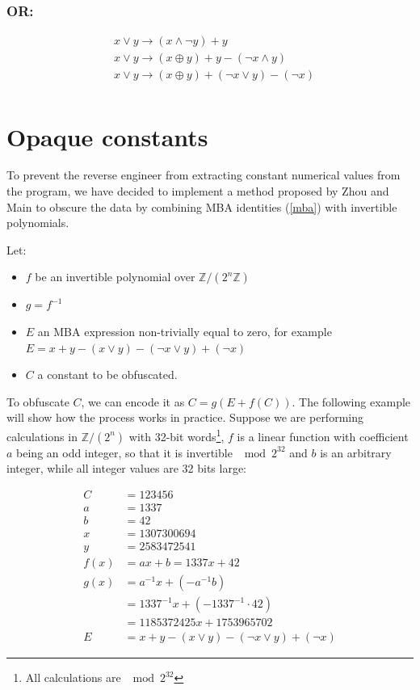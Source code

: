 \documentclass[
  digital, %
  notable,   %
  twoside, %
  nolof,     %
  nolot,     %
]{fithesis3}
\theoremstyle{definition}
\begin{document}
\subsubsection{OR:}
$$
\begin{aligned}
&x \vee y \rightarrow(x \wedge \neg y) + y\\
&x \vee y \rightarrow(x \oplus y)+y-(\neg x \wedge y) \\
&x \vee y \rightarrow(x \oplus y)+(\neg x \vee y)-(\neg x) \\
\end{aligned}
$$

\section{Opaque constants} \label{obf_const}

To prevent the reverse engineer from extracting constant numerical values from the program, we have decided to implement a method proposed by Zhou and Main \cite{mba_zhou} to obscure the data by combining MBA identities (\ref{mba}) with invertible polynomials. 

Let:

\begin{itemize}
    \item $f$ be an invertible polynomial over $\mathbb{Z}/(2^n\mathbb{Z})$
    \item $g = f^{-1}$
    \item $E$ an MBA expression non-trivially equal to zero, for example $E = x + y - (x \vee y)-(\neg x \vee y)+(\neg x)$
    \item $C$ a constant to be obfuscated.
\end{itemize}

To obfuscate $C$, we can encode it as $C = g(E + f(C))$. The following example will show how the process works in practice. Suppose we are performing calculations in $\mathbb{Z}/(2^n)$ with 32-bit words\footnote{All calculations are $\mod 2^{32}$}, $f$ is a linear function with coefficient $a$ being an odd integer, so that it is invertible $\mod 2^{32}$ and $b$ is an arbitrary integer, while all integer values are 32 bits large:

\begin{align*}
C & = 123456 \\
a &= 1337 \\
b &= 42\\
x &= 1307300694 \\
y &= 2583472541 \\
f(x) &= ax + b = 1337x + 42\\
g(x) &= a^{-1}x + (-a^{-1}b) \\
&= 1337^{-1}x + (-1337^{-1}\cdot 42) 
\\&= 1185372425x + 1753965702 \\
E &= x + y - (x \vee y)-(\neg x \vee y)+(\neg x)
\end{align*}
\end{document}
